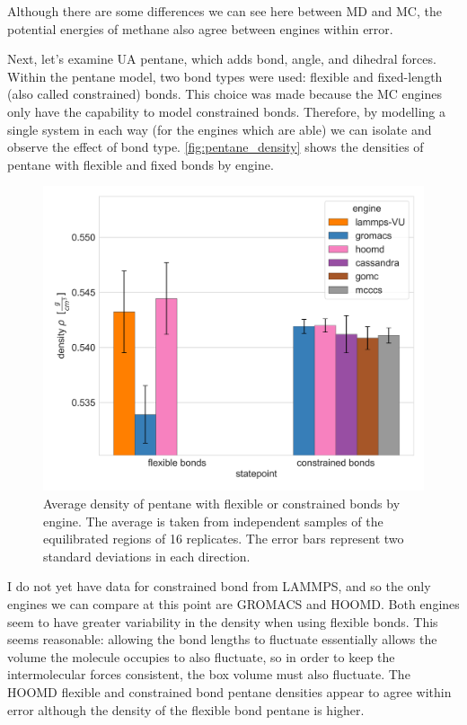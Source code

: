Although there are some differences we can see here between MD and MC, the potential energies of methane also agree between engines within error.

Next, let's examine UA pentane, which adds bond, angle, and dihedral forces. 
Within the pentane model, two bond types were used: flexible and fixed-length (also called constrained) bonds.
This choice was made because the MC engines only have the capability to model constrained bonds. 
Therefore, by modelling a single system in each way (for the engines which are able) we can isolate and observe the effect of bond type.
\autoref{fig:pentane_density} shows the densities of pentane with flexible and fixed bonds by engine.
\begin{figure}[h!]
    \centering
    \includegraphics[width=0.6\linewidth,keepaspectratio]{figures/rep_study/pentane_summary.png}
    \caption{Average density of pentane with flexible or constrained bonds by engine. The average is taken from independent samples of the equilibrated regions of 16 replicates. The error bars represent two standard deviations in each direction.}\label{fig:pentane_density}
\end{figure}
I do not yet have data for constrained bond from LAMMPS, and so the only engines we can compare at this point are GROMACS and HOOMD.
Both engines seem to have greater variability in the density when using flexible bonds. 
This seems reasonable: allowing the bond lengths to fluctuate essentially allows the volume the molecule occupies to also fluctuate, so in order to keep the intermolecular forces consistent, the box volume must also fluctuate.
The HOOMD flexible and constrained bond pentane densities appear to agree within error although the density of the flexible bond pentane is higher.
